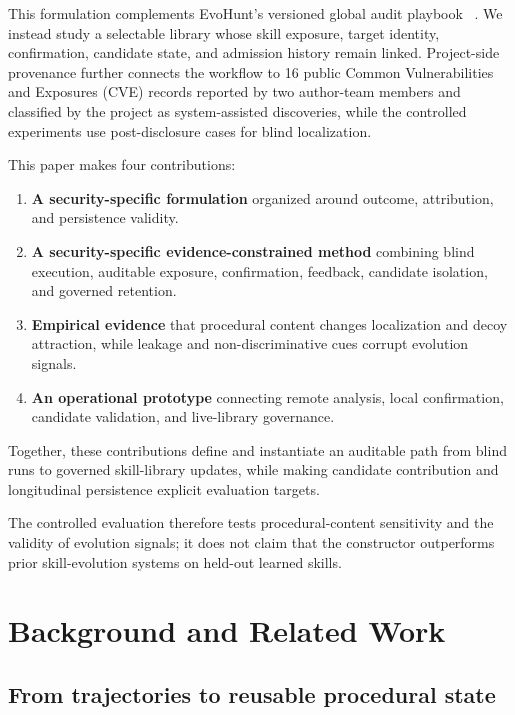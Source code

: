 \documentclass[11pt]{article}
\begin{document}
This formulation complements EvoHunt's versioned global audit playbook
~\cite{evohunt}.  We instead study a selectable library whose skill exposure, target
identity, confirmation, candidate state, and admission history remain linked.  Project-side
provenance further connects the workflow to 16 public Common Vulnerabilities and
Exposures (CVE) records reported by two author-team members and classified by the project
as system-assisted discoveries, while the controlled experiments use post-disclosure
cases for blind localization.

This paper makes four contributions:
\begin{enumerate}[leftmargin=*]
    \item \textbf{A security-specific formulation} organized around outcome,
    attribution, and persistence validity.

    \item \textbf{A security-specific evidence-constrained method} combining blind execution, auditable
    exposure, confirmation, feedback, candidate isolation, and governed retention.

    \item \textbf{Empirical evidence} that procedural content changes localization and
    decoy attraction, while leakage and non-discriminative cues corrupt evolution signals.

    \item \textbf{An operational prototype} connecting remote analysis, local
    confirmation, candidate validation, and live-library governance.
\end{enumerate}

Together, these contributions define and instantiate an auditable path from blind runs
to governed skill-library updates, while making candidate contribution and longitudinal
persistence explicit evaluation targets.

The controlled evaluation therefore tests procedural-content sensitivity and the
validity of evolution signals; it does not claim that the constructor outperforms prior
skill-evolution systems on held-out learned skills.

\section{Background and Related Work}
\label{sec:background}

\subsection{From trajectories to reusable procedural state}
\end{document}
